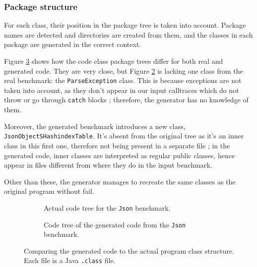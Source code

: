 \documentclass[12pt]{article}
\begin{document}
\subsubsection{Package structure}
For each class, their position in the package tree is taken into account. Package names are detected and directories are created from them, and the classes in each package are generated in the correct context.

Figure \ref{fig:code_tree_comparison} shows how the code class package trees differ for both real and generated code. They are very close, but Figure \ref{fig:code_tree_generated_json} is lacking one class from the real benchmark: the \texttt{ParseException} class. This is because exceptions are not taken into account, as they don't appear in our input calltraces which do not throw or go through \texttt{catch} blocks ; therefore, the generator has no knowledge of them.

Moreover, the generated benchmark introduces a new class, \texttt{JsonObject\-SHashindexTable}. It's absent from the original tree as it's an inner class in this first one, therefore not being present in a separate file ; in the generated code, inner classes are interpreted as regular public classes, hence appear in files different from where they do in the input benchmark.

Other than these, the generator manages to recreate the same classes as the original program without fail.

\begin{figure}[h!]
\centering
\begin{subfigure}{.5\textwidth}
\captionsetup{justification=centering}
\caption{Actual code tree for the \texttt{Json} benchmark.}
\label{fig:code_tree_real_json}
\end{subfigure}%
\begin{subfigure}{.5\textwidth}
\captionsetup{justification=centering}
\caption{Code tree of the generated code from the \texttt{Json} benchmark.}
\label{fig:code_tree_generated_json}
\end{subfigure}
\captionsetup{justification=centering}
\caption{Comparing the generated code to the actual program class structure. Each file is a Java \texttt{.class} file.}
\label{fig:code_tree_comparison}
\end{figure}
\end{document}
